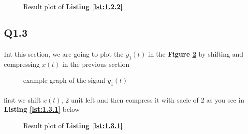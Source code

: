 \vspace{2ex}


\vspace{2ex}

\begin{figure}[H]
    \resizebox{.9\textwidth}{!}{}
    \caption{Result plot of \textbf{Listing \ref{lst:1.2.2}}}
    \label{fig:2.4}
\end{figure}

\subsection{Q1.3}
\paragraph{} Int this section, we are going to plot the $y_1(t)$
in the \textbf{Figure \ref{fig:ex2}} by shifting and compressing
$x(t)$ in the previous section

\begin{figure}[H]
  \centering
 \caption{example graph of the siganl $y_1(t)$}
  \label{fig:ex2}
\end{figure}
\paragraph{} first we shift $x(t)$, 2 unit left and then compress 
it with sacle of 2 as you see in \textbf{Listing \ref{lst:1.3.1}} below

\vspace{2ex}

\begin{figure}[H]
  \resizebox{\textwidth}{!}{}
  \caption{Result plot of \textbf{Listing \ref{lst:1.3.1}}}
  \label{fig:2.6}
\end{figure}

